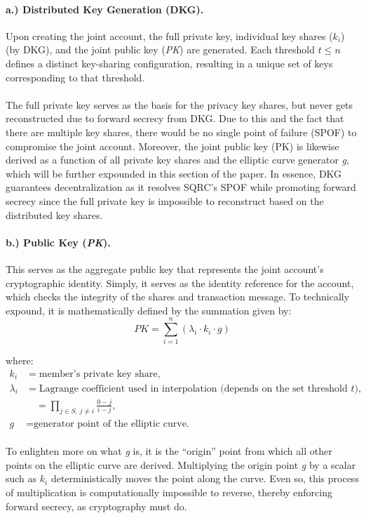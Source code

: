 \documentclass[a4paper]{scl-article}
\begin{document}
\paragraph{a.) Distributed Key Generation (DKG).} 
Upon creating the joint account, the full private key, individual key shares ($k_i$) (by DKG), and the joint public key (\textit{PK}) are generated. Each threshold $t \le n$ defines a distinct key-sharing configuration, resulting in a unique set of keys corresponding to that threshold.

\paragraph{}The full private key serves as the basis for the privacy key shares, but never gets reconstructed due to forward secrecy from DKG. Due to this and the fact that there are multiple key shares, there would be no single point of failure (SPOF) to compromise the joint account. Moreover, the joint public key (PK) is likewise derived as a function of all private key shares and the elliptic curve generator \textit{g}, which will be further expounded in this section of the paper. In essence, DKG guarantees decentralization as it resolves SQRC’s SPOF while promoting forward secrecy since the full private key is impossible to reconstruct based on the distributed key shares.

\paragraph{b.) Public Key (\textit{PK}).}
This serves as the aggregate public key that represents the joint account’s cryptographic identity. Simply, it serves as the identity reference for the account, which checks the integrity of the shares and transaction message. To technically expound, it is mathematically defined by the summation given by:
\[
PK = \sum_{i=1}^{n} (\lambda_i \cdot k_i \cdot g)
\]

\noindent where:
\begin{align*}
k_i &= \text{member’s private key share}, \\
\lambda_i &= \text{Lagrange coefficient used in interpolation (depends on the set threshold } t), \\
           &\quad = \prod_{j \in S,\, j \neq i} \frac{0 - j}{i - j}, \\
g &= \text{generator point of the elliptic curve.}
\end{align*}

\paragraph{}To enlighten more on what \textit{g} is, it is the “origin” point from which all other points on the elliptic curve are derived. Multiplying the origin point \textit{g} by a scalar such as $k_i$ deterministically moves the point along the curve. Even so, this process of multiplication is computationally impossible to reverse, thereby enforcing forward secrecy, as cryptography must do.
\end{document}
